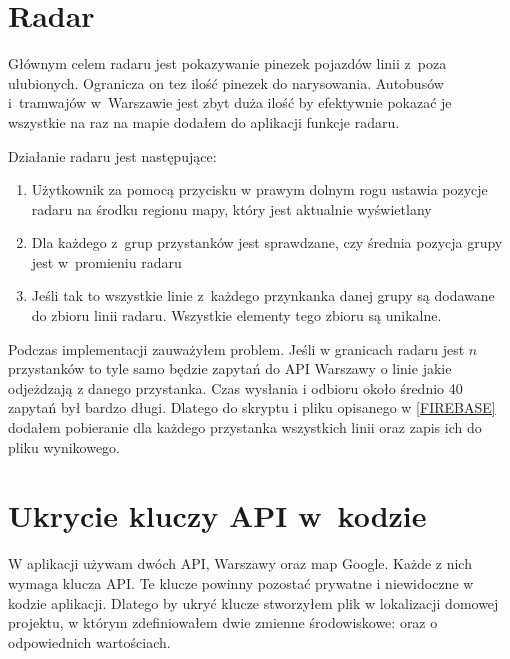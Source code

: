 \documentclass{SGGW-thesis}
\begin{document}
\label{RADAR}
\section{Radar}
Głównym celem radaru jest pokazywanie pinezek pojazdów linii z~poza ulubionych.
Ogranicza on tez ilość pinezek do narysowania.
Autobusów i~tramwajów w~Warszawie jest zbyt duża ilość by efektywnie pokazać je wszystkie na raz na mapie dodałem do aplikacji funkcje radaru.

Działanie radaru jest następujące:
\begin{enumerate}
  \item{Użytkownik za pomocą przycisku w prawym dolnym rogu ustawia pozycje radaru na środku regionu mapy, który jest aktualnie wyświetlany}
  \item{Dla każdego z~grup przystanków jest sprawdzane, czy średnia pozycja grupy jest w~promieniu radaru}
  \item{Jeśli tak to wszystkie linie z~każdego przynkanka danej grupy są dodawane do zbioru linii radaru. Wszystkie elementy tego zbioru są unikalne.}
\end{enumerate}
Podczas implementacji zauważyłem problem.
Jeśli w granicach radaru jest $n$ przystanków to tyle samo będzie zapytań do API Warszawy o linie jakie odjeżdzają z danego przystanka.
Czas wysłania i odbioru około średnio 40 zapytań był bardzo długi.
Dlatego do skryptu i pliku opisanego w \ref{FIREBASE} dodałem pobieranie dla każdego przystanka wszystkich linii oraz zapis ich do pliku wynikowego.



\section{Ukrycie kluczy API w~kodzie}
W aplikacji używam dwóch API, Warszawy oraz map Google.
Każde z nich wymaga klucza API.
Te klucze powinny pozostać prywatne i niewidoczne w kodzie aplikacji.
Dlatego by ukryć klucze stworzyłem plik  w lokalizacji domowej projektu, w którym zdefiniowałem dwie zmienne środowiskowe:
 oraz  o odpowiednich wartościach. 
\end{document}
